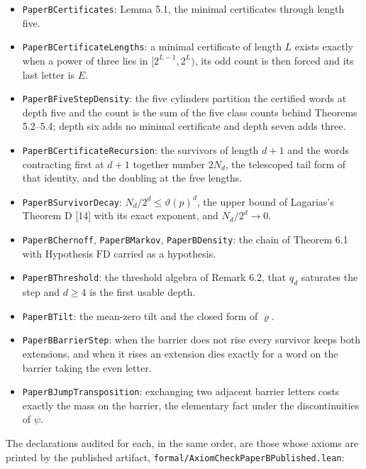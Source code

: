 \documentclass[11pt,a4paper]{article}
\providecommand{\tightlist}{\setlength{\itemsep}{0pt}\setlength{\parskip}{0pt}}
\begin{document}
\begin{itemize}
\tightlist
\item
  \texttt{PaperBCertificates}: Lemma 5.1, the minimal certificates
  through length five.
\item
  \texttt{PaperBCertificateLengths}: a minimal certificate of length
  \(L\) exists exactly when a power of three lies in
  \([2^{L-1},2^{L})\), its odd count is then forced and its last letter
  is \(E\).
\item
  \texttt{PaperBFiveStepDensity}: the five cylinders partition the
  certified words at depth five and the count is the sum of the five
  class counts behind Theorems 5.2--5.4; depth six adds no minimal
  certificate and depth seven adds three.
\item
  \texttt{PaperBCertificateRecursion}: the survivors of length \(d+1\)
  and the words contracting first at \(d+1\) together number \(2N_d\),
  the telescoped tail form of that identity, and the doubling at the
  free lengths.
\item
  \texttt{PaperBSurvivorDecay}: \(N_d/2^d\le\vartheta(p)^d\), the upper
  bound of Lagarias's Theorem D {[}14{]} with its exact exponent, and
  \(N_d/2^d\to0\).
\item
  \texttt{PaperBChernoff}, \texttt{PaperBMarkov},
  \texttt{PaperBDensity}: the chain of Theorem 6.1 with Hypothesis
  \(\mathrm{FD}\) carried as a hypothesis.
\item
  \texttt{PaperBThreshold}: the threshold algebra of Remark 6.2, that
  \(q_d\) saturates the step and \(d\ge4\) is the first usable depth.
\item
  \texttt{PaperBTilt}: the mean-zero tilt and the closed form of
  \(\varrho\).
\item
  \texttt{PaperBBarrierStep}: when the barrier does not rise every
  survivor keeps both extensions, and when it rises an extension dies
  exactly for a word on the barrier taking the even letter.
\item
  \texttt{PaperBJumpTransposition}: exchanging two adjacent barrier
  letters costs exactly the mass on the barrier, the elementary fact
  under the discontinuities of \(\psi\).
\end{itemize}

The declarations audited for each, in the same order, are those whose
axioms are printed by the published artifact,
\texttt{formal/AxiomCheckPaperBPublished.lean}:
\end{document}
